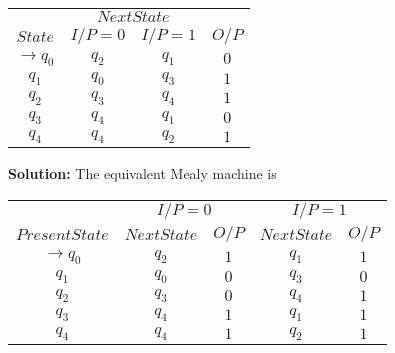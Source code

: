 \documentclass{article}
\begin{document}
\vspace*{0.2cm}
\begin{center}
\begin{tabular}{cccc}
 \hline

 \hline

 \hline

 \hline
 & \multicolumn{2}{c}{$Next State$}\\
 \cline{2-3}
 $State$ &  $I/P=0$ & $I/P=1$  &  $O/P$\\
\hline
$\rightarrow q_0$  &    $q_2$   &  $q_1$   &  $0$ \\
$q_1$              &    $q_0$   &  $q_3$   &  $1$ \\
$q_2$              &    $q_3$   &  $q_4$   &  $1$ \\
$q_3$              &    $q_4$   &  $q_1$   &  $0$ \\
$q_4$              &    $q_4$   &  $q_2$   &  $1$ \\
 \hline

 \hline

 \hline

 \hline
\end{tabular}
\end{center}

\vspace*{0.3cm}
\textbf{Solution:} The equivalent Mealy machine is\\

\vspace*{0.2cm}
\begin{center}
\begin{tabular}{ccccc}
 \hline

 \hline

 \hline

 \hline
 &  \multicolumn{2}{c}{$I/P = 0$ } &  \multicolumn{2}{c}{$I/P = 1$}  \\
  \cline{2-3}                         \cline{4-5}
 $Present State$ &   $Next State$  & $O/P$ &  $Next State$  & $O/P$\\
\hline
$\rightarrow q_0$  &  $q_2$  &  $1$  &  $q_1$  & $1$ \\
$q_1$             &  $q_0$  &  $0$  &  $q_3$  & $0$ \\
$q_2$             &  $q_3$  &  $0$  &  $q_4$  & $1$ \\
$q_3$             &  $q_4$  &  $1$  &  $q_1$  & $1$ \\
$q_4$             &  $q_4$  &  $1$  &  $q_2$  & $1$ \\
 \hline

 \hline

 \hline

 \hline
\end{tabular}
\end{center}
\end{document}
